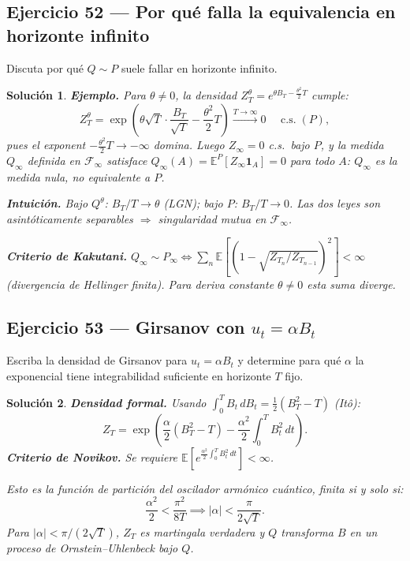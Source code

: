 \documentclass[12pt,letterpaper]{article}
\theoremstyle{ejercicio}
\theoremstyle{solucion}
\newtheorem*{solucion}{Solución}
\newcommand{\E}{\mathbb{E}}
\newcommand{\F}{\mathcal{F}}
\newcommand{\as}{\text{ c.s.}}
\begin{document}
\subsection*{Ejercicio 52 — Por qué falla la equivalencia en horizonte infinito}

\begin{recuadro}
Discuta por qué $Q\sim P$ suele fallar en horizonte infinito.
\end{recuadro}

\begin{solucion}
\textbf{Ejemplo.} Para $\theta\ne 0$, la densidad $Z_T^\theta=e^{\theta B_T-\frac{\theta^2}{2}T}$ cumple:
\[
  Z_T^\theta=\exp\!\left(\theta\sqrt{T}\cdot\frac{B_T}{\sqrt{T}}-\frac{\theta^2}{2}T\right)\xrightarrow{T\to\infty}0\quad\as\;(P),
\]
pues el exponent $-\frac{\theta^2}{2}T\to-\infty$ domina. Luego $Z_\infty=0$ c.s.\ bajo $P$,
y la medida $Q_\infty$ definida en $\F_\infty$ satisface $Q_\infty(A)=\E^P[Z_\infty\mathbf{1}_A]=0$
para todo $A$: $Q_\infty$ es la medida nula, no equivalente a $P$.

\textbf{Intuición.} Bajo $Q^\theta$: $B_T/T\to\theta$ (LGN); bajo $P$: $B_T/T\to 0$.
Las dos leyes son asintóticamente separables $\Rightarrow$ singularidad mutua en $\F_\infty$.

\textbf{Criterio de Kakutani.} $Q_\infty\sim P_\infty\iff\sum_n\E[(1-\sqrt{Z_{T_n}/Z_{T_{n-1}}})^2]<\infty$
(divergencia de Hellinger finita). Para deriva constante $\theta\ne 0$ esta suma diverge.
\end{solucion}

\subsection*{Ejercicio 53 — Girsanov con $u_t=\alpha B_t$}

\begin{recuadro}
Escriba la densidad de Girsanov para $u_t=\alpha B_t$ y determine para qué $\alpha$
la exponencial tiene integrabilidad suficiente en horizonte $T$ fijo.
\end{recuadro}

\begin{solucion}
\textbf{Densidad formal.} Usando $\int_0^T B_t\,dB_t=\frac{1}{2}(B_T^2-T)$ (Itô):
\[
  Z_T=\exp\!\left(\frac{\alpha}{2}(B_T^2-T)-\frac{\alpha^2}{2}\int_0^T B_t^2\,dt\right).
\]
\textbf{Criterio de Novikov.} Se requiere $\E[e^{\frac{\alpha^2}{2}\int_0^T B_t^2\,dt}]<\infty$.

Esto es la función de partición del oscilador armónico cuántico, finita si y solo si:
\[
  \frac{\alpha^2}{2}<\frac{\pi^2}{8T}\implies|\alpha|<\frac{\pi}{2\sqrt{T}}.
\]
Para $|\alpha|<\pi/(2\sqrt{T})$, $Z_T$ es martingala verdadera y $Q$ transforma $B$ en
un proceso de Ornstein–Uhlenbeck bajo $Q$.
\end{solucion}
\end{document}
